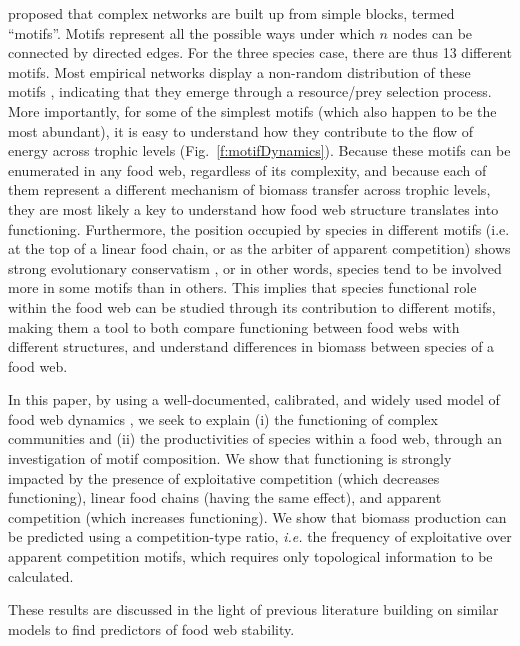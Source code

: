 \documentclass[12pt]{article}
\begin{document}
\textcite{Milo2002} proposed that complex networks are built up from simple blocks, termed ``motifs''. Motifs represent all the possible ways under which $n$ nodes can be connected by directed edges. For the three species case, there are thus 13 different motifs. Most empirical networks display a non-random distribution of these motifs \parencite{Bascompte2005,Stouffer2007}, indicating that they emerge through a resource/prey selection process. More importantly, for some of the simplest motifs (which also happen to be the most abundant), it is easy to understand how they contribute to the flow of energy across trophic levels (Fig.~\ref{f:motifDynamics}). Because these motifs can be enumerated in any food web, regardless of its complexity, and because each of them represent a different mechanism of biomass transfer across trophic levels, they are most likely a key to understand how food web structure translates into functioning. Furthermore, the position occupied by species in different motifs (i.e. at the top of a linear food chain, or as the arbiter of apparent competition) shows strong evolutionary conservatism \parencite{Stouffer2012}, or in other words, species tend to be involved more in some motifs than in others. This implies that species functional role within the food web can be studied through its contribution to different motifs, making them a tool to both compare functioning between food webs with different structures, and understand differences in biomass between species of a food web.

In this paper, by using a well-documented, calibrated, and widely used model of food web dynamics \parencite{Brose2006a}, we seek to explain (i) the functioning of complex communities and (ii) the productivities of species within a food web, through an investigation of motif composition. We show that functioning is strongly impacted by the presence of exploitative competition (which decreases functioning), linear food chains (having the same effect), and apparent competition (which increases functioning). We show that biomass production can be predicted using a competition-type ratio, \emph{i.e.} the frequency of exploitative over apparent competition motifs, which requires only topological information to be calculated.

These results are discussed in the light of previous literature building on similar models to find predictors of food web stability.
\end{document}
